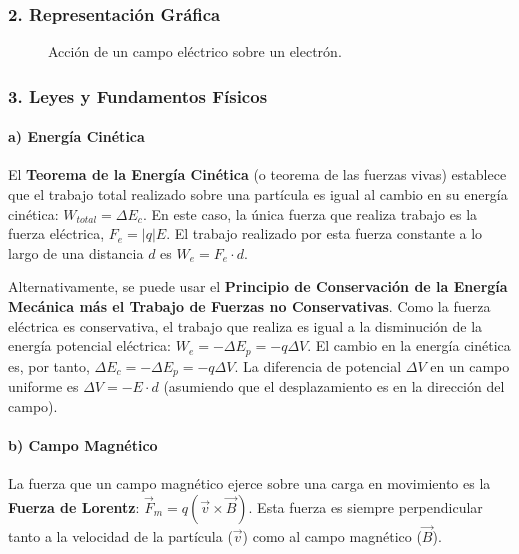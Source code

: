\subsubsection*{2. Representación Gráfica}
\begin{figure}[H]
    \centering
    \caption{Acción de un campo eléctrico sobre un electrón.}
\end{figure}

\subsubsection*{3. Leyes y Fundamentos Físicos}
\paragraph*{a) Energía Cinética}
El \textbf{Teorema de la Energía Cinética} (o teorema de las fuerzas vivas) establece que el trabajo total realizado sobre una partícula es igual al cambio en su energía cinética: $W_{total} = \Delta E_c$.
En este caso, la única fuerza que realiza trabajo es la fuerza eléctrica, $F_e = |q| E$. El trabajo realizado por esta fuerza constante a lo largo de una distancia $d$ es $W_e = F_e \cdot d$.

Alternativamente, se puede usar el \textbf{Principio de Conservación de la Energía Mecánica más el Trabajo de Fuerzas no Conservativas}. Como la fuerza eléctrica es conservativa, el trabajo que realiza es igual a la disminución de la energía potencial eléctrica: $W_e = -\Delta E_p = -q \Delta V$. El cambio en la energía cinética es, por tanto, $\Delta E_c = - \Delta E_p = -q \Delta V$. La diferencia de potencial $\Delta V$ en un campo uniforme es $\Delta V = -E \cdot d$ (asumiendo que el desplazamiento es en la dirección del campo).

\paragraph*{b) Campo Magnético}
La fuerza que un campo magnético ejerce sobre una carga en movimiento es la \textbf{Fuerza de Lorentz}: $\vec{F}_m = q (\vec{v} \times \vec{B})$. Esta fuerza es siempre perpendicular tanto a la velocidad de la partícula ($\vec{v}$) como al campo magnético ($\vec{B}$).

